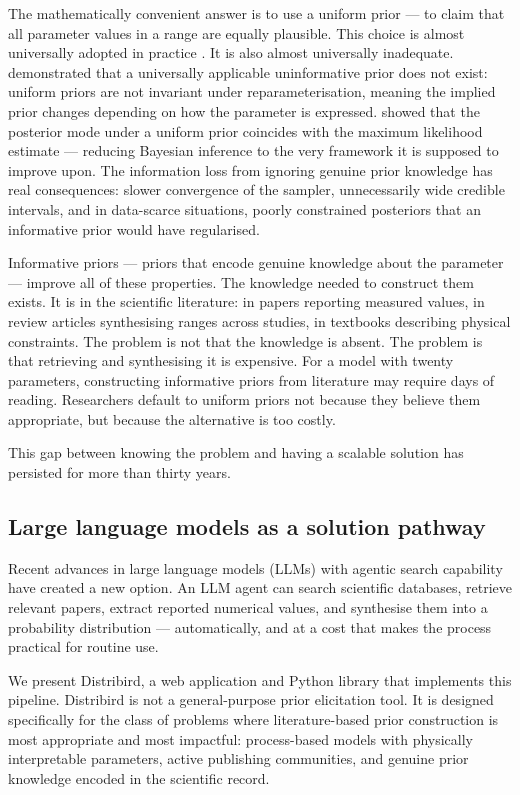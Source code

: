 \documentclass[11pt,a4paper]{article}
\begin{document}
The mathematically convenient answer is to use a uniform prior --- to claim that all parameter
values in a range are equally plausible. This choice is almost universally adopted in practice
\citep{Wallach2021}. It is also almost universally inadequate. \citet{Pericchi1991} demonstrated
that a universally applicable uninformative prior does not exist: uniform priors are not invariant
under reparameterisation, meaning the implied prior changes depending on how the parameter is
expressed. \citet{Gelman1996} showed that the posterior mode under a uniform prior coincides with
the maximum likelihood estimate --- reducing Bayesian inference to the very framework it is
supposed to improve upon. The information loss from ignoring genuine prior knowledge has real
consequences: slower convergence of the sampler, unnecessarily wide credible intervals, and in
data-scarce situations, poorly constrained posteriors that an informative prior would have
regularised.

Informative priors --- priors that encode genuine knowledge about the parameter --- improve all of
these properties. The knowledge needed to construct them exists. It is in the scientific
literature: in papers reporting measured values, in review articles synthesising ranges across
studies, in textbooks describing physical constraints. The problem is not that the knowledge is
absent. The problem is that retrieving and synthesising it is expensive. For a model with twenty
parameters, constructing informative priors from literature may require days of reading.
Researchers default to uniform priors not because they believe them appropriate, but because the
alternative is too costly.

This gap between knowing the problem and having a scalable solution has persisted for more than
thirty years.

\subsection{Large language models as a solution pathway}

Recent advances in large language models (LLMs) with agentic search capability have created a new
option. An LLM agent can search scientific databases, retrieve relevant papers, extract reported
numerical values, and synthesise them into a probability distribution --- automatically, and at a
cost that makes the process practical for routine use.

We present Distribird, a web application and Python library that implements this pipeline. Distribird is
not a general-purpose prior elicitation tool. It is designed specifically for the class of
problems where literature-based prior construction is most appropriate and most impactful:
process-based models with physically interpretable parameters, active publishing communities, and
genuine prior knowledge encoded in the scientific record.
\end{document}
